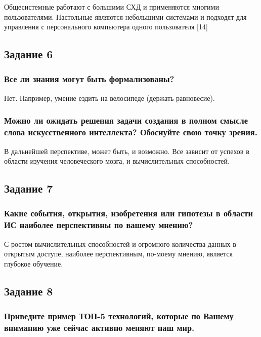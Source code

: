\documentclass[14pt,a4paper,report]{report}
\begin{document}
Общесистемные работают с большими СХД и применяются многими пользователями. Настольные являются небольшими системами и подходят для управления с персонального компьютера одного пользователя [14]

\subsection{Задание 6}

\subsubsection{Все ли знания могут быть формализованы?}

Нет. Например, умение ездить на велосипеде (держать равновесие).

\subsubsection{Можно ли ожидать решения задачи создания в полном смысле слова искусственного интеллекта? Обоснуйте свою точку зрения.}

В дальнейшей перспективе, может быть, и возможно. Все зависит от успехов в области изучения человеческого мозга, и вычислительных способностей.

\subsection{Задание 7}

\subsubsection{Какие события, открытия, изобретения или гипотезы в области ИС наиболее перспективны по вашему мнению?}

С ростом вычислительных способностей и огромного количества данных в открытым доступе, наиболее перспективным, по-моему мнению, является глубокое обучение.

\subsection{Задание 8}

\subsubsection{Приведите пример ТОП-5 технологий, которые по Вашему вниманию уже сейчас активно меняют наш мир.}
\end{document}
